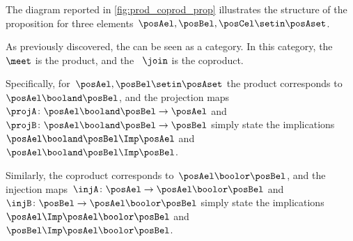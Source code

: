The diagram reported in \cref{fig:prod_coprod_prop} illustrates the structure of the proposition  for three elements~$\posAel,\posBel,\posCel\setin \posAset$.

As previously discovered, the  can be seen as a category.
In this category, the ~$\meet$ is the product, and the ~$\join$ is the coproduct.

Specifically, for~$\posAel,\posBel\setin \posAset$ the product corresponds to~$\posAel\booland \posBel$, and the projection maps~$\projA\colon \posAel\booland \posBel\to \posAel$ and~$\projB\colon \posAel\booland \posBel\to \posBel$ simply state the implications~$\posAel \booland \posBel \Imp \posAel$ and~$\posAel \booland \posBel \Imp \posBel$.

Similarly, the coproduct corresponds to~$\posAel\boolor \posBel$, and the injection maps~$\injA\colon \posAel\to \posAel\boolor \posBel$ and~$\injB\colon \posBel\to \posAel\boolor \posBel$ simply state the implications~$\posAel \Imp \posAel \boolor \posBel$ and~$\posBel \Imp \posAel \boolor \posBel$.
